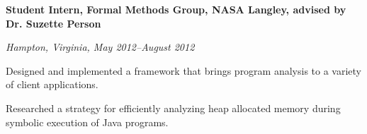 \documentclass[10pt,letterpaper]{article}
\renewenvironment{itemize}{
  \begin{list}{}{
    \setlength{\leftmargin}{1.5em}
    \setlength{\itemsep}{0.25em}
    \setlength{\parskip}{0pt}
    \setlength{\parsep}{0.25em}
  }
}{
  \end{list}
}
\begin{document}
\begin{comment}
\begin{itemize}
\item \textbf{Host and Fellowship Coordinator, August 2012--July 2013}
\item \emph{Lutheran Student Center (ELCA), University of Nebraska-Lincoln}
    \begin{itemize}
    \item Clean and maintain the Lutheran Student Center building.
    \item Engage students with fun fellowship opportunities such as movie
    nights and pool leagues.
    \end{itemize}
\end{itemize}
\end{comment}

\begin{itemize}
\item \textbf{Student Intern, Formal Methods Group, NASA Langley, advised by Dr. Suzette Person}
\item \emph{Hampton, Virginia, May 2012--August 2012}
    \begin{itemize}
    \item Designed and implemented a framework that brings program analysis
    to a variety of client applications.
    \item Researched a strategy for efficiently analyzing heap allocated
    memory during symbolic execution of Java programs.
    \end{itemize}
\end{itemize}

\begin{comment}
\begin{itemize}
\item \textbf{Teaching Assistant for CSE361 (Software Engineering), August 2011--December 2011}
\item \emph{University of Nebraska-Lincoln, Department of Computer Science}
	\begin{itemize}
    \item Developed a semester project, assisted in class, graded
    assignments.
	\end{itemize}
\end{itemize}
\end{comment}
\end{document}
